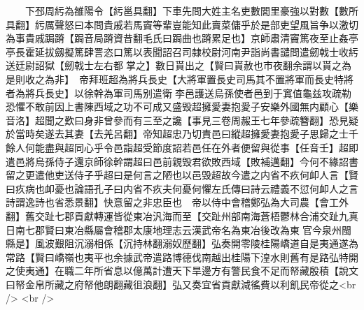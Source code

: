　　下邳周䊸為雒陽令【䊸邕具翻】下車先問大姓主名吏數閭里豪強以對數【數所具翻】䊸厲聲怒曰本問貴戚若馬竇等輩豈能知此賣菜傭乎於是部吏望風旨争以激切為事貴戚跼蹐【跼音局蹐資昔翻毛氏曰跼曲也蹐累足也】京師肅清竇篤夜至止姦亭亭長霍延拔劔擬篤肆詈恣口篤以表聞詔召司隸校尉河南尹詣尚書譴問遣劒戟士收䊸送廷尉詔獄【劒戟士左右都掌之】數日貰出之【賢曰貰赦也市夜翻余謂以貰之為是則收之為非】　帝拜班超為將兵長史【大將軍置長史司馬其不置將軍而長史特將者為將兵長史】以徐幹為軍司馬别遣衛李邑護送烏孫使者邑到于窴值龜兹攻疏勒恐懼不敢前因上書陳西域之功不可成又盛毁超擁愛妻抱愛子安樂外國無内顧心【樂音洛】超聞之歎曰身非曾參而有三至之讒【事見三卷周赧王七年參疏簪翻】恐見疑於當時矣遂去其妻【去羌呂翻】帝知超忠乃切責邑曰縱超擁愛妻抱愛子思歸之士千餘人何能盡與超同心乎令邑詣超受節度詔若邑任在外者便留與從事【任音壬】超即遣邑將烏孫侍子還京師徐幹謂超曰邑前親毁君欲敗西域【敗補邁翻】今何不緣詔書留之更遣他吏送侍子乎超曰是何言之陋也以邑毁超故今遣之内省不疚何卹人言【賢曰疚病也卹憂也論語孔子曰内省不疚夫何憂何懼左氏傳曰詩云禮義不愆何卹人之言詩謂逸詩也省悉景翻】快意留之非忠臣也　帝以侍中會稽鄭弘為大司農【會工外翻】舊交趾七郡貢獻轉運皆從東冶汎海而至【交趾州部南海蒼梧鬱林合浦交趾九真日南七郡賢曰東冶縣屬會稽郡太康地理志云漢武帝名為東冶後改為東官今泉州閩縣是】風波艱阻沉溺相係【沉持林翻溺奴歷翻】弘奏開零陵桂陽嶠道自是夷通遂為常路【賢曰嶠嶺也夷平也余據武帝遣路博德伐南越出桂陽下湟水則舊有是路弘特開之使夷通】在職二年所省息以億萬計遭天下旱邊方有警民食不足而帑藏殷積【說文曰帑金帛所藏之府帑他朗翻藏徂浪翻】弘又奏宜省貢獻減徭費以利飢民帝從之<br />
<br />
